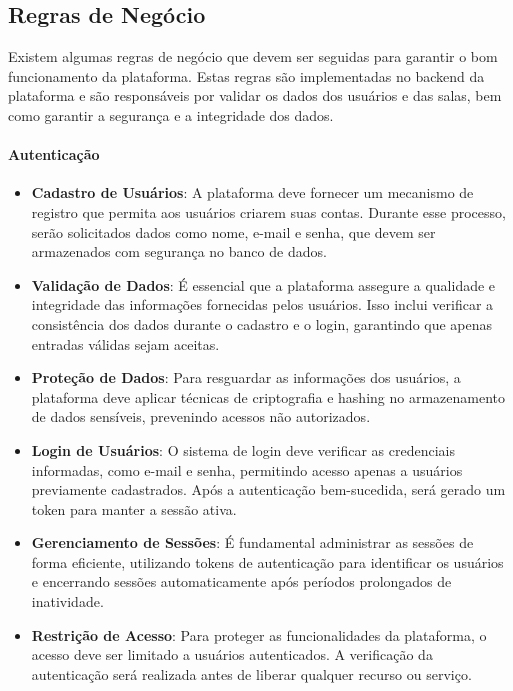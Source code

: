 \subsection{Regras de Negócio}

Existem algumas regras de negócio que devem ser seguidas para garantir o bom funcionamento da plataforma. Estas regras são implementadas no backend da plataforma e são responsáveis por validar os dados dos usuários e das salas, bem como garantir a segurança e a integridade dos dados.

\paragraph{Autenticação}

\begin{itemize}
    \item \textbf{Cadastro de Usuários}: A plataforma deve fornecer um mecanismo de registro que permita aos usuários criarem suas contas. Durante esse processo, serão solicitados dados como nome, e-mail e senha, que devem ser armazenados com segurança no banco de dados.
    \item \textbf{Validação de Dados}: É essencial que a plataforma assegure a qualidade e integridade das informações fornecidas pelos usuários. Isso inclui verificar a consistência dos dados durante o cadastro e o login, garantindo que apenas entradas válidas sejam aceitas.
    \item \textbf{Proteção de Dados}: Para resguardar as informações dos usuários, a plataforma deve aplicar técnicas de criptografia e hashing no armazenamento de dados sensíveis, prevenindo acessos não autorizados.
    \item \textbf{Login de Usuários}: O sistema de login deve verificar as credenciais informadas, como e-mail e senha, permitindo acesso apenas a usuários previamente cadastrados. Após a autenticação bem-sucedida, será gerado um token para manter a sessão ativa.
    \item \textbf{Gerenciamento de Sessões}: É fundamental administrar as sessões de forma eficiente, utilizando tokens de autenticação para identificar os usuários e encerrando sessões automaticamente após períodos prolongados de inatividade.
    \item \textbf{Restrição de Acesso}: Para proteger as funcionalidades da plataforma, o acesso deve ser limitado a usuários autenticados. A verificação da autenticação será realizada antes de liberar qualquer recurso ou serviço.
\end{itemize}

